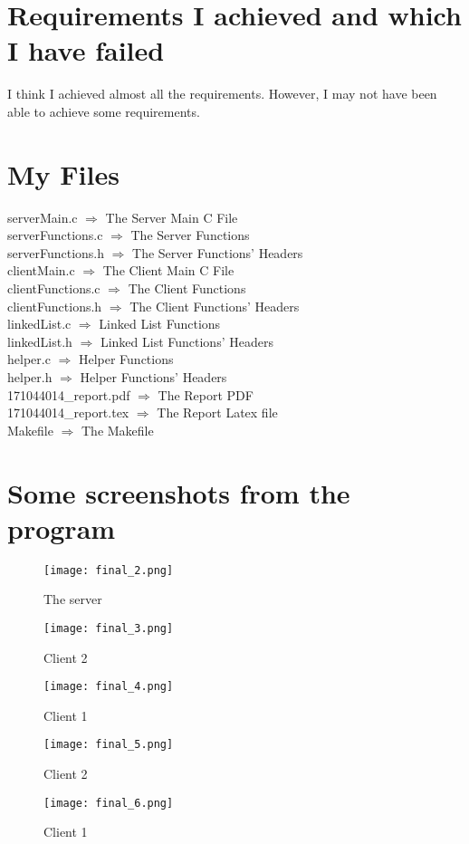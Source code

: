 \documentclass[20pt]{article}
\begin{document}
\section{Requirements I achieved and which I have failed}
I think I achieved almost all the requirements. However, I may not have been able to achieve some requirements.
\\
\section{My Files}
serverMain.c $\Rightarrow$ The Server Main C File \\
serverFunctions.c $\Rightarrow$ The Server Functions \\
serverFunctions.h $\Rightarrow$ The Server Functions' Headers \\
clientMain.c $\Rightarrow$ The Client Main C File \\
clientFunctions.c $\Rightarrow$ The Client Functions \\
clientFunctions.h $\Rightarrow$ The Client Functions' Headers \\
linkedList.c $\Rightarrow$ Linked List Functions \\
linkedList.h $\Rightarrow$ Linked List Functions' Headers \\
helper.c $\Rightarrow$ Helper Functions \\
helper.h $\Rightarrow$ Helper Functions' Headers \\
171044014\_report.pdf $\Rightarrow$ The Report PDF \\
171044014\_report.tex $\Rightarrow$ The Report Latex file \\
Makefile $\Rightarrow$ The Makefile \\

\section{Some screenshots from the program}
\begin{figure}[h!]
  \texttt{[image: final\_2.png]}
  \caption{The server}
  \label{fig:code}
\end{figure}

\begin{figure}[h!]
  \texttt{[image: final\_3.png]}
  \caption{Client 2}
  \label{fig:code}
\end{figure}

\begin{figure}[h!]
  \texttt{[image: final\_4.png]}
  \caption{Client 1}
  \label{fig:code}
\end{figure}

\begin{figure}[h!]
  \texttt{[image: final\_5.png]}
  \caption{Client 2}
  \label{fig:code}
\end{figure}

\begin{figure}[h!]
  \texttt{[image: final\_6.png]}
  \caption{Client 1}
  \label{fig:code}
\end{figure}
\end{document}
